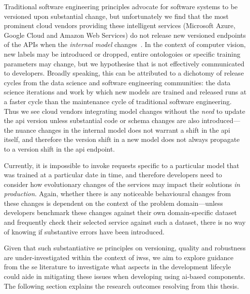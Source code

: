 Traditional software engineering principles advocate for software systems to be versioned upon substantial change, but unfortunately we find that the most prominent cloud vendors providing these intelligent services (Microsoft Azure, Google Cloud and Amazon Web Services) do not release new versioned endpoints of the APIs when the \textit{internal model} changes~\citep{Cummaudo:2019va}. In the context of computer vision, new labels may be introduced or dropped, entire ontologoies or specific training parameters may change, but we hypothesise that is not effectively communicated to developers. Broadly speaking, this can be attributed to a dichotomy of release cycles from the data science and software engineering communities: the data science iterations and work by which new models are trained and released runs at a faster cycle than the maintenance cycle of traditional software engineering. Thus we see cloud vendors integrating model changes without the \textit{need} to update the \gls{api} version unless substantial code or schema changes are also introduced---the nuance changes in the internal model does not warrant a shift in the \gls{api} itself, and therefore the version shift in a new model does not always propagate to a version shift in the \gls{api} endpoint.

Currently, it is impossible to invoke requests specific to a particular model that was trained at a particular date in time, and therefore developers need to consider how evolutionary changes of the services may impact their solutions \textit{in production}. Again, whether there is any noticeable behavioural changes from these changes is dependent on the context of the problem domain---unless developers benchmark these changes against their own domain-specific dataset and frequently check their selected service against such a dataset, there is no way of knowing if substantive errors have been introduced. 

Given that such substantiative \gls{se} principles on versioning, quality and robustness are under-investigated within the context of \glspl{iws}, we aim to explore guidance from the \gls{se} literature to investigate what aspects in the development lifecyle could aide in mitigating these issues when developing using \gls{ai}-based components. The following section explains the research outcomes resolving from this thesis.